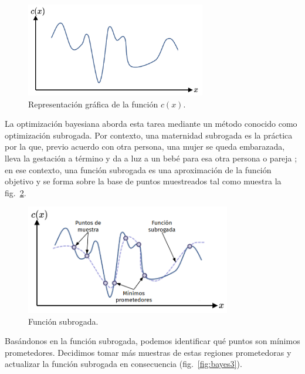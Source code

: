 \documentclass[a4paper,12pt]{article}
\begin{document}
\begin{figure}[H]
	\begin{center}
		\includegraphics[width=0.7\textwidth]{bayes_opt_1_v2.png}
		\caption{Representación gráfica de la función $c(x)$.}
		\label{fig:cx}
	\end{center}
\end{figure}

La optimización bayesiana aborda esta tarea mediante un método conocido como optimización subrogada. Por contexto, una maternidad subrogada es la práctica por la que, previo acuerdo con otra persona, una mujer se queda embarazada, lleva la gestación a término y da a luz a un bebé para esa otra persona o pareja \citep{vientre_alquiler}; en ese contexto, una función subrogada es una aproximación de la función objetivo y se forma sobre la base de puntos muestreados tal como muestra la fig.~\ref{fig:bayes2}.

\begin{figure}[H]
	\begin{center}
		\includegraphics[width=0.8\textwidth]{bayes_opt_2_v2.png}
		\caption{Función subrogada.}
		\label{fig:bayes2}
	\end{center}
\end{figure}

Basándonos en la función subrogada, podemos identificar qué puntos son mínimos prometedores. Decidimos tomar más muestras de estas regiones prometedoras y actualizar la función subrogada en consecuencia (fig.~\ref{fig:bayes3}).
\end{document}
